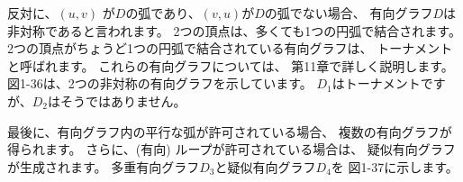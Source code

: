 
反対に、$(u, v)$ が$D$の弧であり、$(v, u)$が$D$の弧でない場合、
有向グラフ$D$は非対称であると言われます。 
2つの頂点は、多くても1つの円弧で結合されます。
2つの頂点がちょうど1つの円弧で結合されている有向グラフは、
トーナメントと呼ばれます。 これらの有向グラフについては、
第11章で詳しく説明します。図1-36は、2つの非対称の有向グラフを示しています。
$D_1$はトーナメントですが、$D_2$はそうではありません。


最後に、有向グラフ内の平行な弧が許可されている場合、
複数の有向グラフが得られます。 さらに、(有向) ループが許可されている場合は、
疑似有向グラフが生成されます。 多重有向グラフ$D_3$と疑似有向グラフ$D_4$を
図1-37に示します。